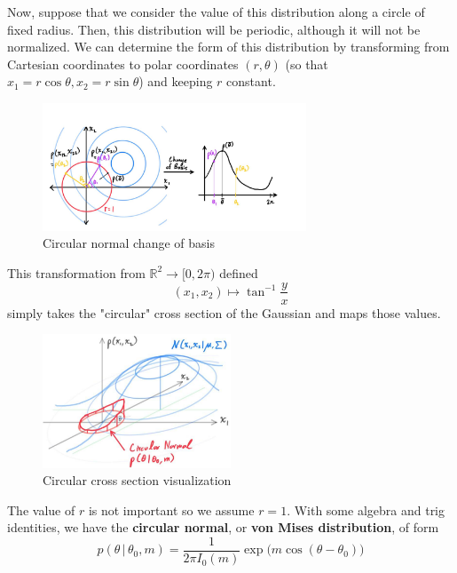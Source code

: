   Now, suppose that we consider the value of this distribution along a circle of fixed radius. Then, this distribution will be periodic, although it will not be normalized. We can determine the form of this distribution by transforming from Cartesian coordinates to polar coordinates $(r, \theta)$ (so that $x_1 = r \cos{\theta}, x_2 = r \sin{\theta}$) and keeping $r$ constant.

  \begin{figure}[H]
    \centering
    \includegraphics[width=0.7\textwidth]{img/circular_normal_change_of_basis.jpg}
    \caption{Circular normal change of basis}
  \end{figure}

  This transformation from $\mathbb{R}^2 \longrightarrow [0, 2\pi)$ defined
  \begin{equation}
    (x_1, x_2) \mapsto \tan^{-1} \frac{y}{x}
  \end{equation}
  simply takes the "circular" cross section of the Gaussian and maps those values.

  \begin{figure}[H]
    \centering
    \includegraphics[width=0.5\textwidth]{img/Circular_Cross_Section.jpg}
    \caption{Circular cross section visualization}
  \end{figure}

  The value of $r$ is not important so we assume $r=1$. With some algebra and trig identities, we have the \textbf{circular normal}, or \textbf{von Mises distribution}, of form
  \begin{equation}
    p(\theta\,|\,\theta_0, m) = \frac{1}{2\pi I_0(m)} \exp \big( m \cos(\theta - \theta_0) \big)
  \end{equation}

